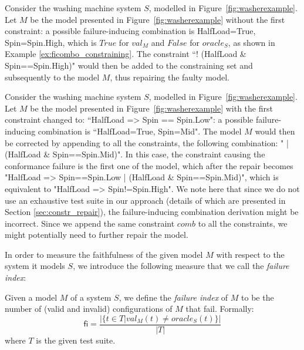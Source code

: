 \begin{tikzborder}{\cite{Gargantini16:validation}}
\begin{tikzborder}{\cite{gargantini_combinatorial_2017}}
\begin{tikzborder}{\cite{gargantini_combinatorial_2017}}
\begin{example}\label{ex:constraining}
	Consider the washing machine system $S$, modelled in Figure~\ref{fig:washerexample}. Let $M$ be the model presented in Figure~\ref{fig:washerexample} without the first constraint: a possible failure-inducing combination is \textsf{HalfLoad=True, Spin=Spin.High}, which is $\mathit{True}$ for $val_M$ and $\mathit{False}$ for $\mathit{oracle}_{S}$, as shown in Example \ref{ex:ficombo_constraining}. 
	The constraint ``\textsf{! (HalfLoad \& Spin==Spin.High)}" would then be added to the constraining set and subsequently to the model $M$, thus repairing the faulty model.
\end{example}
\begin{example}\label{ex:relaxing}
	Consider the washing machine system $S$, modelled in Figure~\ref{fig:washerexample}. Let $M$ be the model presented in Figure~\ref{fig:washerexample} with the first constraint changed to: ``\textsf{HalfLoad => Spin == Spin.Low}": a possible failure-inducing combination 
	is ``\textsf{HalfLoad=True, Spin=Mid}".
	The model $M$ would then be corrected by appending to all the constraints, the following combination: "\textsf{ | (HalfLoad \& Spin==Spin.Mid)}". In this case, the constraint causing the conformance failure is the first one of the model, which after the repair becomes "\textsf{HalfLoad => Spin==Spin.Low | (HalfLoad \& Spin==Spin.Mid)}", which is equivalent to "\textsf{HalfLoad => Spin!=Spin.High}". We note here that since we do not use an exhaustive test suite in our approach (details of which are presented in Section \ref{sec:constr_repair}),  the failure-inducing combination derivation might be incorrect.
	Since we append the same constraint $comb$ to all the constraints, we might potentially need to further repair the model.
\end{example}

In order to measure the faithfulness of the given model $M$ with respect to the system it models $S$, we introduce the following measure that we call the \emph{failure index}:

\begin{defn}\label{def:failureindex}
	Given a model $M$ of a system $S$, we define the \emph{failure index} of $M$ to be the number of (valid and invalid) configurations of $M$ that fail. Formally:
	\[\mathsf{fi}=\frac{|\{t\in T | val_{M}(t)\neq \mathit{oracle}_{S}(t)\}|}{|T|}\]
	where $T$ is the given test suite. %
\end{defn}
\be


\end{tikzborder}
\end{tikzborder}
\end{tikzborder}
